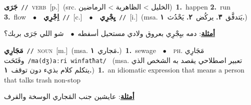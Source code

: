 \documentclass[10pt,a4paper,twoside]{article} %
\begin{document}
\begin{multicols}{2}
{\setlength\topsep{0pt}\textbf{\foreignlanguage{arabic}{جَرَى}}\ {\color{gray}\texttt{//}\color{black}}\ \textsc{verb}\ [p.]\ (src. \color{gray}\foreignlanguage{arabic}{الخليل > الظاهرية > الرماضين}\color{black})\ \textbf{1.}~happen  \textbf{2.}~run  \textbf{3.}~flow\ \ $\bullet$\ \ \setlength\topsep{0pt}\textbf{\foreignlanguage{arabic}{اِجْرِي}}\ {\color{gray}\texttt{//}\color{black}}\ [c.]\ \ $\bullet$\ \ \setlength\topsep{0pt}\textbf{\foreignlanguage{arabic}{يِجْرِي}}\ {\color{gray}\texttt{//}\color{black}}\ [i.]\ \color{gray}(msa. \foreignlanguage{arabic}{يَتدفَّق}~\foreignlanguage{arabic}{\textbf{٣.}}  \foreignlanguage{arabic}{يركُض}~\foreignlanguage{arabic}{\textbf{٢.}}  \foreignlanguage{arabic}{يَحْدُث}~\foreignlanguage{arabic}{\textbf{١.}})\color{black}\  \begin{flushright}\color{gray}\foreignlanguage{arabic}{\textbf{\underline{\foreignlanguage{arabic}{أمثلة}}}: دمه بيِجْرِي بعروق ولادي مستحيل أسفطه\ $\bullet$\ \  شو اللي جَرَى بربك؟}\end{flushright}\color{black}} \vspace{2mm}

{\setlength\topsep{0pt}\textbf{\foreignlanguage{arabic}{مَجَارِي}}\ {\color{gray}\texttt{//}\color{black}}\ \textsc{noun}\ [m.]\ \color{gray}(msa. \foreignlanguage{arabic}{مَجاري}~\foreignlanguage{arabic}{\textbf{١.}})\color{black}\ \textbf{1.}~sewage\ \ $\bullet$\ \ \textsc{ph.} \color{gray} \foreignlanguage{arabic}{مَجَارِي وفَتَحَت}\color{black}\ {\color{gray}\texttt{/{\sffamily ma(dʒ)aːri winfatħat}/}\color{black}}\ \color{gray} (msa. \foreignlanguage{arabic}{تعبير اصطلاحي يقصد به الشخص الذي يتكلم كلام بذيء دون توقف}~\foreignlanguage{arabic}{\textbf{١.}})\color{black}\ \textbf{1.}~an idiomatic expression that means a person that talks trash non-stop\  \begin{flushright}\color{gray}\foreignlanguage{arabic}{\textbf{\underline{\foreignlanguage{arabic}{أمثلة}}}: عايشين جنب المَجاري الوسخة والقرف}\end{flushright}\color{black}} \vspace{2mm}


\end{multicols}
\end{document}
